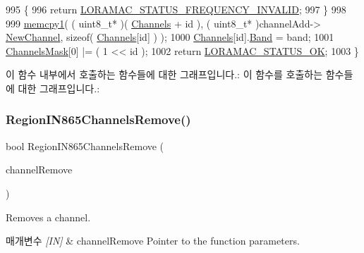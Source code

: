 \begin{DoxyCode}
995     \{
996         \textcolor{keywordflow}{return} \mbox{\hyperlink{group___l_o_r_a_m_a_c_gga1d18f26b344040b3ec5c3db662919661ae3ea7b89796aed5a320013d9743b2955}{LORAMAC\_STATUS\_FREQUENCY\_INVALID}};
997     \}
998 
999     \mbox{\hyperlink{utilities_8c_abfbe672c7136122f16c9214bc4ba8d21}{memcpy1}}( ( uint8\_t* )( \mbox{\hyperlink{_region_i_n865_8c_adad6dcb99199b5142166021a8aac9aa2}{Channels}} + \textcolor{keywordtype}{id} ), ( uint8\_t* )channelAdd->
      \mbox{\hyperlink{structs_channel_add_params_afc31493a105479490228fd896b20b45c}{NewChannel}}, \textcolor{keyword}{sizeof}( \mbox{\hyperlink{_region_i_n865_8c_adad6dcb99199b5142166021a8aac9aa2}{Channels}}[\textcolor{keywordtype}{id}] ) );
1000     \mbox{\hyperlink{_region_i_n865_8c_adad6dcb99199b5142166021a8aac9aa2}{Channels}}[id].\mbox{\hyperlink{structs_channel_params_a724c03aa06953111c3291243831f251b}{Band}} = band;
1001     \mbox{\hyperlink{_region_i_n865_8c_a2188957b5ca6af8092154d7ccbfa5757}{ChannelsMask}}[0] |= ( 1 << id );
1002     \textcolor{keywordflow}{return} \mbox{\hyperlink{group___l_o_r_a_m_a_c_gga1d18f26b344040b3ec5c3db662919661a03db5fca052313edb3823c014b653a74}{LORAMAC\_STATUS\_OK}};
1003 \}
\end{DoxyCode}
이 함수 내부에서 호출하는 함수들에 대한 그래프입니다.\+:
이 함수를 호출하는 함수들에 대한 그래프입니다.\+:
\mbox{\label{group___r_e_g_i_o_n_i_n865_ga06a432cedafb503d6e75757bc7d7e1b0}} 
\subsubsection{\texorpdfstring{Region\+I\+N865\+Channels\+Remove()}{RegionIN865ChannelsRemove()}}
{\footnotesize\ttfamily bool Region\+I\+N865\+Channels\+Remove (\begin{DoxyParamCaption}\item[{\mbox{\hyperlink{group___r_e_g_i_o_n_gaa37468560d2fc81a977b57a48e5d72c0}{Channel\+Remove\+Params\+\_\+t}} $\ast$}]{channel\+Remove }\end{DoxyParamCaption})}



Removes a channel. 


\begin{DoxyParams}{매개변수}
{\em \mbox{[}\+I\+N\mbox{]}} & channel\+Remove Pointer to the function parameters.\\
\hline
\end{DoxyParams}

